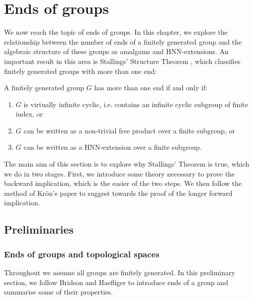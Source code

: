 \section{Ends of groups} \label{Ends of groups} %


We now reach the topic of ends of groups. In this chapter, we explore the relationship between the number of ends of a finitely generated group and the algebraic structure of these groups as amalgams and HNN-extensions. An important result in this area is Stallings’ Structure Theorem \cite[p.~4]{S71}, which classifies finitely generated groups with more than one end:

\begin{theorem} 
\label{thm:SST}
A finitely generated group \(G\) has more than one end if and only if:
    \begin{enumerate}
        \item \(G\) is virtually infinite cyclic, i.e. contains an infinite cyclic subgroup of finite index, or
        \item \(G\) can be written as a non-trivial free product over a finite subgroup, or
        \item \(G\) can be written as a HNN-extension over a finite subgroup. 
    \end{enumerate}
\end{theorem}

The main aim of this section is to explore why Stallings' Theorem is true, which we do in two stages. First, we introduce some theory necessary to prove the backward implication, which is the easier of the two steps. We then follow the method of Kr{\"o}n's paper \cite{K10} to suggest towards the proof of the longer forward implication. 

\subsection{Preliminaries}
\subsubsection{Ends of groups and topological spaces}
Throughout we assume all groups are finitely generated. In this preliminary section, we follow Bridson and Haefliger \cite[p.~144--148]{bridson_haefliger_metric_1999} to introduce ends of a group and summarise some of their properties. 

